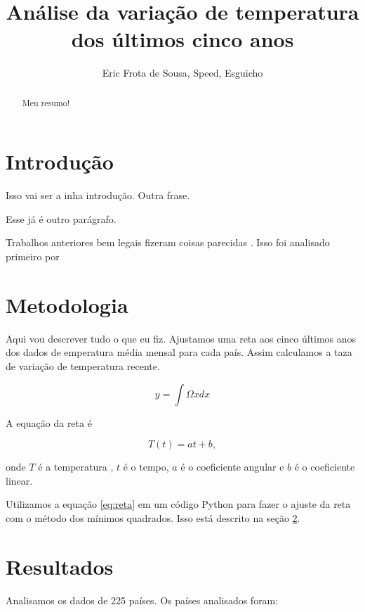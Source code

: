 \documentclass{article}
\newcommand{\Title}{Análise da variação de temperatura dos últimos cinco anos}
\begin{document}
\title{\Title}
\author{Eric Frota de Sousa, Speed, Esguicho}

\maketitle

\begin{abstract}
Meu resumo!
\end{abstract}

\section{Introdução}
Isso vai ser a inha introdução.
Outra frase.

Esse já é outro parágrafo.

Trabalhos anteriores bem legais fizeram coisas parecidas
\citep{Hansen2010}.
Isso foi analisado primeiro por \citet{Hansen2010}

\section{Metodologia}
\label{sec:metodos}

Aqui vou descrever tudo o que eu fiz.
Ajustamos uma reta aos cinco últimos anos dos dados
de emperatura média mensal para cada país.
Assim calculamos a taza de variação de temperatura recente.



\begin{equation}
y = \int\Omega x dx
\end{equation}

A equação da reta é

\begin{equation}
T(t) = a t + b,
\label{eq:reta}
\end{equation}

\noindent
onde $T$ é a temperatura , $t$ é o tempo, $a$ é o coeficiente angular
e $b$ é o coeficiente linear.

Utilizamos a equação \ref{eq:reta} em um código Python para fazer o ajuste da
reta com o método dos mínimos quadrados.
Isso está descrito na seção \ref{sec:metodos}.


\section{Resultados}

Analisamos os dados de 225 países.
Os países analisados foram: \Paises
\end{document}

